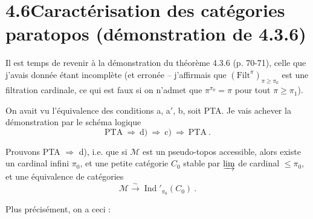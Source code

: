 \documentclass[11pt]{article}
\newcommand{\msp}[1]{\marginpar{\footnotesize [#1]}}
\newcommand{\Ind}{\operatorname{Ind}}
\begin{document}
\msp{page 139}

\section*{4.6\quad Caractérisation des catégories paratopos (démonstration de 4.3.6)}

Il est temps de revenir à la démonstration du théorème 4.3.6 (p. 70-71), celle que j'avais donnée étant incomplète (et erronée – j'affirmais que $(\mathrm{Filt}^{\pi})_{\pi\geqslant\pi_0}$ est une filtration cardinale, ce qui est faux si on n'admet que $\pi^{\pi_0}=\pi$ pour tout $\pi\geqslant\pi_1$).

On avait vu l'équivalence des conditions a, a$'$, b, soit PTA. Je vais achever la démonstration par le schéma logique
\[
\text{PTA} \ \Longrightarrow\ \text{d)} \ \Longrightarrow\ \text{c)} \ \Longrightarrow\ \text{PTA}\ . \tag*{$(*)$}
\]

Prouvons PTA $\Longrightarrow$ d), i.e. que si $\mathcal{M}$ est un pseudo-topos accessible, alors existe un cardinal infini $\pi_0$, et une petite catégorie $C_0$ stable par $\varinjlim$ de cardinal $\leqslant\pi_0$, et une équivalence de catégories %
\[
\mathcal{M} \xrightarrow{\ \sim\ } \Ind'_{\pi_0}(C_0)\ . \tag*{(4.6.1)}
\]

Plus précisément, on a ceci :
\end{document}
